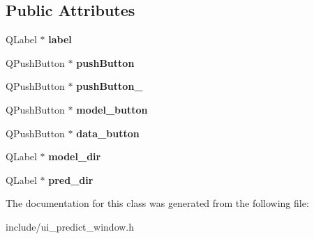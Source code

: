 \subsection*{Public Attributes}
\begin{DoxyCompactItemize}
\item 
\mbox{\label{class_ui___predict___window_a76a125817f86e89161b99cde9e769dde}} 
Q\+Label $\ast$ {\bfseries label}
\item 
\mbox{\label{class_ui___predict___window_aa17a629740904bee7626a69d360ee1b6}} 
Q\+Push\+Button $\ast$ {\bfseries push\+Button}
\item 
\mbox{\label{class_ui___predict___window_a0ecde42fce26934d632f6eca829662c9}} 
Q\+Push\+Button $\ast$ {\bfseries push\+Button\+\_}
\item 
\mbox{\label{class_ui___predict___window_aecd5f09d21f19ad91ffc217701b0aa4a}} 
Q\+Push\+Button $\ast$ {\bfseries model\+\_\+button}
\item 
\mbox{\label{class_ui___predict___window_ab8a40d12860a898180a96e4b9d4705e9}} 
Q\+Push\+Button $\ast$ {\bfseries data\+\_\+button}
\item 
\mbox{\label{class_ui___predict___window_a5e49390b32488d5be8b0c8e33427f77f}} 
Q\+Label $\ast$ {\bfseries model\+\_\+dir}
\item 
\mbox{\label{class_ui___predict___window_adbb4b57e5a3de4c45e5ed76ff91e9019}} 
Q\+Label $\ast$ {\bfseries pred\+\_\+dir}
\end{DoxyCompactItemize}


The documentation for this class was generated from the following file\+:\begin{DoxyCompactItemize}
\item 
include/ui\+\_\+predict\+\_\+window.\+h\end{DoxyCompactItemize}
